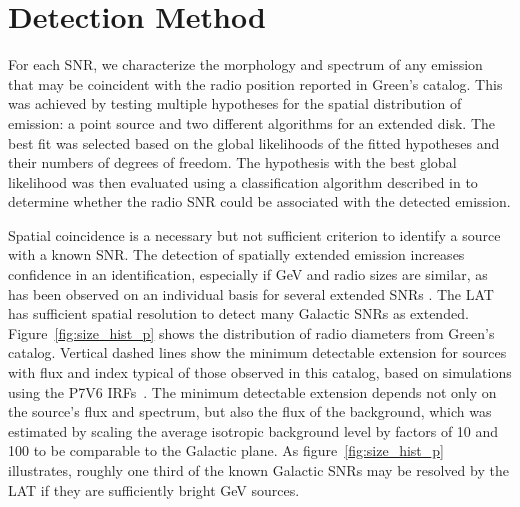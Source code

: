 
\section{Detection Method}\label{snrcat:DetectMethod}
For each SNR, we characterize the morphology and spectrum of any \gam{} emission that may be coincident with the radio position reported in Green's catalog. This was achieved by testing multiple hypotheses for the spatial distribution of \gam{} emission: a point source and two different algorithms for an extended disk. The best fit was selected based on the global likelihoods of the fitted hypotheses and their numbers of degrees of freedom. The hypothesis with the best global likelihood was then evaluated using a classification algorithm described in \cite{snrCat} to determine whether the radio SNR could be associated with the detected \gam{} emission. 

Spatial coincidence is a necessary but not sufficient criterion to identify a \gam{} source with a known SNR. The detection of spatially extended \gam{} emission increases confidence in an identification, especially if GeV and radio sizes are similar, as has been observed on an individual basis for several extended SNRs \citep[e.g.][]{Lande12}. The LAT has sufficient spatial resolution to detect many Galactic SNRs as extended. Figure~\ref{fig:size_hist_p} shows the distribution of radio diameters from Green's catalog. Vertical dashed lines show the minimum detectable extension for sources with flux and index typical of those observed in this catalog, based on simulations using the P7V6 IRFs~\citep{Lande12}. The minimum detectable extension depends not only on the source's flux and spectrum, but also the flux of the background, which was estimated by scaling the average isotropic background level by factors of 10 and 100 to be comparable to the Galactic plane. As figure~\ref{fig:size_hist_p} illustrates, roughly one third of the known Galactic SNRs may be resolved by the LAT if they are sufficiently bright GeV sources.


